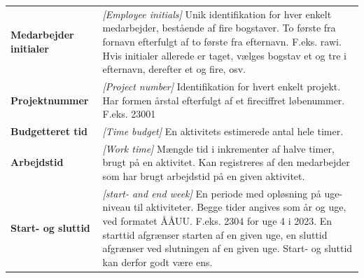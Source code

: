 \begin{table}[H]
\begin{tabular}{>{\bfseries}l p{}}
        Medarbejder initialer & \textit{[Employee initials]} Unik identifikation for hver enkelt medarbejder, bestående af fire bogstaver. To første fra fornavn efterfulgt af to første fra efternavn. F.eks. rawi. Hvis initialer allerede er taget, vælges bogstav et og tre i efternavn, derefter et og fire, osv.                                     \\
        Projektnummer         & \textit{[Project number]} Identifikation for hvert enkelt projekt. Har formen årstal efterfulgt af et fireciffret løbenummer. F.eks. 23001                                                                                                                                                                                 \\
        Budgetteret tid       & \textit{[Time budget]} En aktivitets estimerede antal hele timer.                                                                                                                                                                                                                                                          \\
        Arbejdstid            & \textit{[Work time]} Mængde tid i inkrementer af halve timer, brugt på en aktivitet. Kan registreres af den medarbejder som har brugt arbejdstid på en given aktivitet.                                                                                                                                                    \\
        Start- og sluttid     & \textit{[start- and end week]} En periode med opløsning på uge-niveau til aktiviteter. Begge tider angives som år og uge, ved formatet ÅÅUU. F.eks. 2304 for uge 4 i 2023. En starttid afgrænser starten af en given uge, en sluttid afgrænser ved slutningen af en given uge. Start- og sluttid kan derfor godt være ens.
    \end{tabular}
\end{table}
